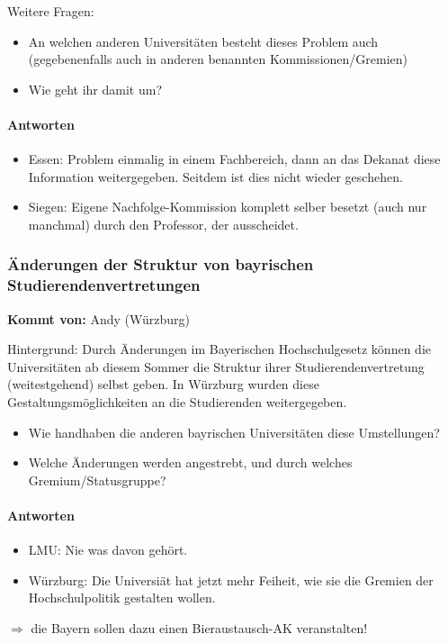       Weitere Fragen: \\
      \begin{itemize}
        \item An welchen anderen Universitäten besteht dieses Problem auch (gegebenenfalls auch in anderen benannten Kommissionen/Gremien)
        \item Wie geht ihr damit um?
      \end{itemize}

      \paragraph{Antworten}
        \begin{itemize}
          \item Essen: Problem einmalig in einem Fachbereich, dann an das Dekanat diese Information weitergegeben. Seitdem ist dies nicht wieder geschehen.
          \item Siegen: Eigene Nachfolge-Kommission komplett selber besetzt (auch nur manchmal) durch den Professor, der ausscheidet.
        \end{itemize}

    \subsubsection*{Änderungen der Struktur von bayrischen Studierendenvertretungen}
      \textbf{Kommt von:} Andy (Würzburg)

Hintergrund: Durch Änderungen im Bayerischen Hochschulgesetz können die Universitäten ab diesem Sommer die Struktur ihrer Studierendenvertretung (weitestgehend) selbst geben. In Würzburg wurden diese Gestaltungsmöglichkeiten an die Studierenden weitergegeben.
      \begin{itemize}
        \item Wie handhaben die anderen bayrischen Universitäten diese Umstellungen?
        \item Welche Änderungen werden angestrebt, und durch welches Gremium/Statusgruppe?
      \end{itemize}

      \paragraph{Antworten}
        \begin{itemize}
          \item LMU: Nie was davon gehört.
          \item Würzburg: Die Universiät hat jetzt mehr Feiheit, wie sie die Gremien der Hochschulpolitik gestalten wollen.
        \end{itemize}
        $\Rightarrow$ die Bayern sollen dazu einen Bieraustausch-AK veranstalten!

